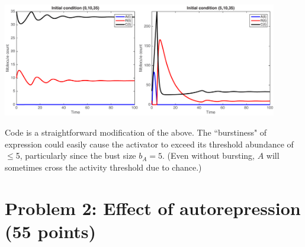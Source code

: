\documentclass{article}
\begin{document}
\begin{enumerate}[a)]
\begin{center}
\includegraphics[width=0.9\textwidth]{prob1c.pdf}
\end{center}

{\color{red}
Code is a straightforward modification of the above. The ``burstiness" of expression could easily cause the activator to exceed its threshold abundance of $\leq$5, particularly since the bust size $b_A = 5$. (Even without bursting, $A$ will sometimes cross the activity threshold due to chance.)

}

\end{enumerate}

\section*{Problem 2: Effect of autorepression (55 points)}
\end{document}
